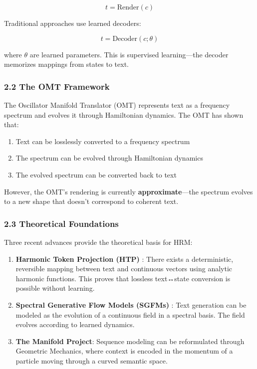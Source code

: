 \documentclass[
  11pt,
  a4paper,
]{article}
\providecommand{\tightlist}{%
  \setlength{\itemsep}{0pt}\setlength{\parskip}{0pt}}
\begin{document}
\[
t = \text{Render}(c)
\]

Traditional approaches use learned decoders:

\[
t = \text{Decoder}(c; \theta)
\]

where \(\theta\) are learned parameters. This is supervised
learning---the decoder memorizes mappings from states to text.

\subsubsection{2.2 The OMT Framework}\label{the-omt-framework}

The Oscillator Manifold Translator (OMT) represents text as a frequency
spectrum and evolves it through Hamiltonian dynamics. The OMT has shown
that:

\begin{enumerate}
\def\labelenumi{\arabic{enumi}.}
\tightlist
\item
  Text can be losslessly converted to a frequency spectrum
\item
  The spectrum can be evolved through Hamiltonian dynamics
\item
  The evolved spectrum can be converted back to text
\end{enumerate}

However, the OMT's rendering is currently \textbf{approximate}---the
spectrum evolves to a new shape that doesn't correspond to coherent
text.

\subsubsection{2.3 Theoretical
Foundations}\label{theoretical-foundations}

Three recent advances provide the theoretical basis for HRM:

\begin{enumerate}
\def\labelenumi{\arabic{enumi}.}
\item
  \textbf{Harmonic Token Projection (HTP)} : There exists a
  deterministic, reversible mapping between text and continuous vectors
  using analytic harmonic functions. This proves that lossless
  text↔state conversion is possible without learning.
\item
  \textbf{Spectral Generative Flow Models (SGFMs)} : Text generation can
  be modeled as the evolution of a continuous field in a spectral basis.
  The field evolves according to learned dynamics.
\item
  \textbf{The Manifold Project}: Sequence modeling can be reformulated
  through Geometric Mechanics, where context is encoded in the momentum
  of a particle moving through a curved semantic space.
\end{enumerate}
\end{document}
